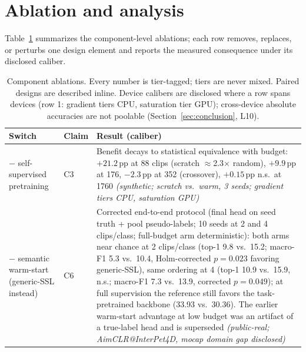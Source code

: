 \section{Ablation and analysis}\label{sec:ablation}

Table~\ref{tab:ablation} summarizes the component-level ablations; each row removes, replaces, or perturbs one design element and reports the measured consequence under its disclosed caliber.

\begin{table}[pos=htbp]
\centering
\caption{Component ablations. Every number is tier-tagged; tiers are never mixed. Paired designs are described inline. Device calibers are disclosed where a row spans devices (row 1: gradient tiers CPU, saturation tier GPU); cross-device absolute accuracies are not poolable (Section~\ref{sec:conclusion}, L10).}
\label{tab:ablation}
\footnotesize
{}
\begin{tabularx}{\linewidth}{>{\raggedright\arraybackslash}p{2.6cm}>{\raggedright\arraybackslash}p{1.8cm}>{\raggedright\arraybackslash}X}
\hline
Switch & Claim & Result (caliber) \\
\hline
$-$ self-supervised pretraining & C3 & Benefit decays to statistical equivalence with budget: $+21.2$\,pp at 88 clips (scratch $\approx$2.3$\times$ random), $+9.9$\,pp at 176, $-2.3$\,pp at 352 (crossover), $+0.15$\,pp n.s.\ at 1760 \emph{(synthetic; scratch vs.\ warm, 3 seeds; gradient tiers CPU, saturation GPU)} \\
$-$ semantic warm-start (generic-SSL instead) & C6 & Corrected end-to-end protocol (final head on seed truth + pool pseudo-labels; 10 seeds at 2 and 4 clips/class; full-budget arm deterministic): both arms near chance at 2 clips/class (top-1 9.8 vs.\ 15.2; macro-F1 5.3 vs.\ 10.4, Holm-corrected $p=0.023$ favoring generic-SSL), same ordering at 4 (top-1 10.9 vs.\ 15.9, n.s.; macro-F1 7.3 vs.\ 13.9, corrected $p=0.049$); at full supervision the reference still favors the task-pretrained backbone (33.93 vs.\ 30.36). The earlier warm-start advantage at low budget was an artifact of a true-label head and is superseded \emph{(public-real; AimCLR@InterPet4D, mocap domain gap disclosed)} \\

\end{tabularx}
\end{table}
